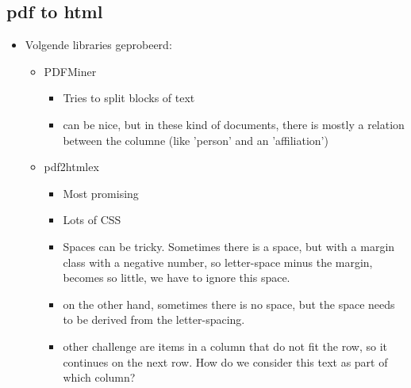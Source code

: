 \subsection{pdf to html}
\begin{itemize}
    \item Volgende libraries geprobeerd:
    \begin{itemize}
        \item PDFMiner
        \begin{itemize}
            \item Tries to split blocks of text
            \item can be nice, but in these kind of documents, there is mostly a relation between the columne (like 'person' and an 'affiliation')
        \end{itemize}
        \item pdf2htmlex
        \begin{itemize}
            \item Most promising
            \item Lots of CSS
            \item Spaces can be tricky. Sometimes there is a space, but with a margin class with a negative number, so letter-space minus the margin, becomes so little, we have to ignore this space.
            \item on the other hand, sometimes there is no space, but the space needs to be derived from the letter-spacing.
            \item other challenge are items in a column that do not fit the row, so it continues on the next row. How do we consider this text as part of which column?
        \end{itemize}
    \end{itemize}
\end{itemize}
